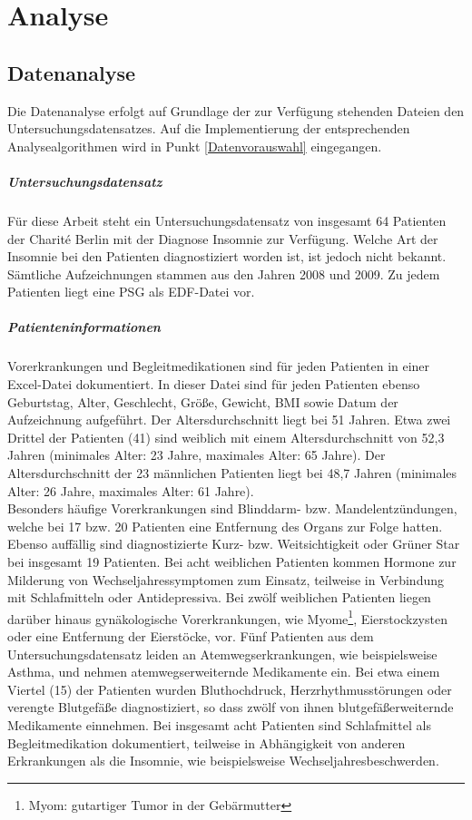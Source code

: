 \chapter{Analyse}

\section{Datenanalyse}\label{datenanalyse}

Die Datenanalyse erfolgt auf Grundlage der zur Verfügung stehenden Dateien den Untersuchungsdatensatzes. Auf die Implementierung der entsprechenden Analysealgorithmen wird in Punkt \ref{Datenvorauswahl} eingegangen.

\paragraph{Untersuchungsdatensatz} Für diese Arbeit steht ein Untersuchungsdatensatz von insgesamt 64 Patienten der Charit\'{e} Berlin mit der Diagnose Insomnie zur Verfügung. Welche Art der Insomnie bei den Patienten diagnostiziert worden ist, ist jedoch nicht bekannt. Sämtliche Aufzeichnungen stammen aus den Jahren 2008 und 2009. Zu jedem Patienten liegt eine \acs{PSG} als \acs{EDF}-Datei vor. 

\paragraph{Patienteninformationen} Vorerkrankungen und Begleitmedikationen sind für jeden Patienten in einer Excel-Datei dokumentiert. In dieser Datei sind für jeden Patienten ebenso Geburtstag, Alter, Geschlecht, Größe, Gewicht, BMI sowie Datum der Aufzeichnung aufgeführt. Der Altersdurchschnitt liegt bei 51 Jahren. Etwa zwei Drittel der Patienten (41) sind weiblich mit einem Altersdurchschnitt von 52,3 Jahren (minimales Alter: 23 Jahre, maximales Alter: 65 Jahre). Der Altersdurchschnitt der 23 männlichen Patienten liegt bei 48,7 Jahren (minimales Alter: 26 Jahre, maximales Alter: 61 Jahre).\\

Besonders häufige Vorerkrankungen sind Blinddarm- bzw. Mandelentzündungen, welche bei 17 bzw. 20 Patienten eine Entfernung des Organs zur Folge hatten. Ebenso auffällig sind diagnostizierte Kurz- bzw. Weitsichtigkeit oder Grüner Star bei insgesamt 19 Patienten. Bei acht weiblichen Patienten kommen Hormone zur Milderung von Wechseljahressymptomen zum Einsatz, teilweise in Verbindung mit Schlafmitteln oder Antidepressiva. Bei zwölf weiblichen Patienten liegen darüber hinaus gynäkologische Vorerkrankungen, wie Myome\footnote{Myom: gutartiger Tumor in der Gebärmutter}, Eierstockzysten oder eine Entfernung der Eierstöcke, vor. Fünf Patienten aus dem Untersuchungsdatensatz leiden an Atemwegserkrankungen, wie beispielsweise Asthma, und nehmen atemwegserweiternde Medikamente ein. Bei etwa einem Viertel (15) der Patienten wurden Bluthochdruck, Herzrhythmusstörungen oder verengte Blutgefäße diagnostiziert, so dass zwölf von ihnen blutgefäßerweiternde Medikamente einnehmen. Bei insgesamt acht Patienten sind Schlafmittel als Begleitmedikation dokumentiert, teilweise in Abhängigkeit von anderen Erkrankungen als die Insomnie, wie beispielsweise Wechseljahresbeschwerden.

